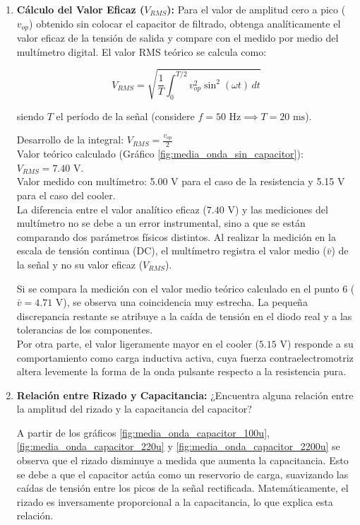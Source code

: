 \begin{enumerate}
    \item \textbf{Cálculo del Valor Eficaz ($V_{RMS}$):}
    Para el valor de amplitud cero a pico ($v_{op}$) obtenido sin colocar el capacitor de filtrado, obtenga analíticamente el valor eficaz de la tensión de salida y compare con el medido por medio del multímetro digital. El valor RMS teórico se calcula como:
    
    \[ V_{RMS} = \sqrt{\frac{1}{T} \int_{0}^{T/2} v_{op}^2 \sin^2(\omega t) \, dt} \]
    
    siendo $T$ el período de la señal (considere $f = 50\text{ Hz} \implies T = 20\text{ ms}$).
    
    \begin{tcolorbox}[colback=white, colframe=gray!50, title=Respuesta]
        Desarrollo de la integral: $V_{RMS} = \frac{v_{op}}{2}$ \\
        Valor teórico calculado (Gráfico \ref{fig:media_onda_sin_capacitor}): $V_{RMS} = \text{7.40 V}$. \\
        Valor medido con multímetro: 5.00 V para el caso de la resistencia y 5.15 V para el caso del cooler. \\
        
        La diferencia entre el valor analítico eficaz ($7.40\text{ V}$) y las mediciones del multímetro no se debe a un error instrumental, sino a que se están comparando dos parámetros físicos distintos. Al realizar la medición en la escala de tensión continua (DC), el multímetro registra el valor medio ($\bar{v}$) de la señal y no su valor eficaz ($V_{RMS}$). 
        
        Si se compara la medición con el valor medio teórico calculado en el punto 6 ($\bar{v} = 4.71\text{ V}$), se observa una coincidencia muy estrecha. La pequeña discrepancia restante se atribuye a la caída de tensión en el diodo real y a las tolerancias de los componentes.\\
        Por otra parte, el valor ligeramente mayor en el cooler ($5.15\text{ V}$) responde a su comportamiento como carga inductiva activa, cuya fuerza contraelectromotriz altera levemente la forma de la onda pulsante respecto a la resistencia pura.
    \end{tcolorbox}
    \item \textbf{Relación entre Rizado y Capacitancia:}
    ¿Encuentra alguna relación entre la amplitud del rizado y la capacitancia del capacitor?
    
    \begin{tcolorbox}[colback=white, colframe=gray!50, title=Respuesta]
        A partir de los gráficos \ref{fig:media_onda_capacitor_100u}, \ref{fig:media_onda_capacitor_220u} y \ref{fig:media_onda_capacitor_2200u} se observa que el rizado disminuye a medida que aumenta la capacitancia. Esto se debe a que el capacitor actúa como un reservorio de carga, suavizando las caídas de tensión entre los picos de la señal rectificada. Matemáticamente, el rizado es inversamente proporcional a la capacitancia, lo que explica esta relación.
    \end{tcolorbox}


\end{enumerate}
